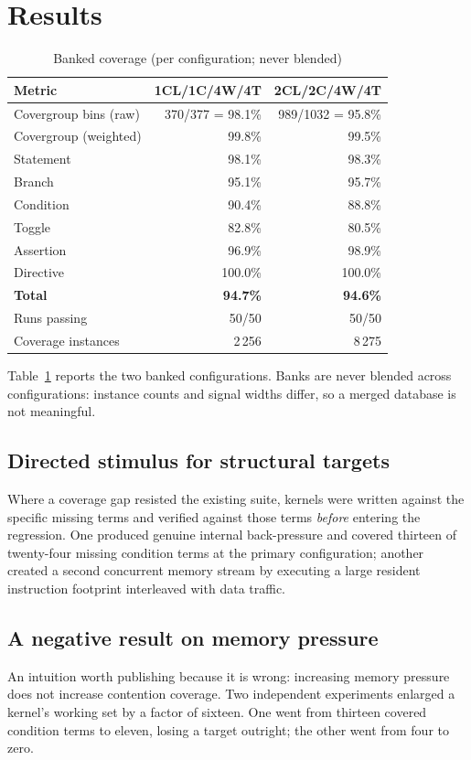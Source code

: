 \documentclass[conference]{IEEEtran}
\begin{document}
\section{Results}
\label{sec:results}

\begin{table}[t]
\caption{Banked coverage (per configuration; never blended)}
\label{tab:fe-coverage}
\centering
\small
\begin{tabular}{lrr}
\toprule
Metric & 1CL/1C/4W/4T & 2CL/2C/4W/4T \\
\midrule
Covergroup bins (raw) & 370/377 = 98.1\% & 989/1032 = 95.8\% \\
Covergroup (weighted) & 99.8\% & 99.5\% \\
Statement & 98.1\% & 98.3\% \\
Branch & 95.1\% & 95.7\% \\
Condition & 90.4\% & 88.8\% \\
Toggle & 82.8\% & 80.5\% \\
Assertion & 96.9\% & 98.9\% \\
Directive & 100.0\% & 100.0\% \\
\midrule
\textbf{Total} & \textbf{94.7\%} & \textbf{94.6\%} \\
Runs passing & 50/50 & 50/50 \\
Coverage instances & 2\,256 & 8\,275 \\
\bottomrule
\end{tabular}
\end{table}

Table~\ref{tab:fe-coverage} reports the two banked configurations. Banks
are never blended across configurations: instance counts and signal widths
differ, so a merged database is not meaningful.

\subsection{Directed stimulus for structural targets}
Where a coverage gap resisted the existing suite, kernels were written
against the specific missing terms and verified against those terms
\emph{before} entering the regression. One produced genuine internal
back-pressure and covered thirteen of twenty-four missing condition terms
at the primary configuration; another created a second concurrent memory
stream by executing a large resident instruction footprint interleaved with
data traffic.

\subsection{A negative result on memory pressure}
An intuition worth publishing because it is wrong: increasing memory
pressure does not increase contention coverage. Two independent
experiments enlarged a kernel's working set by a factor of sixteen. One
went from thirteen covered condition terms to eleven, losing a target
outright; the other went from four to zero.
\end{document}
